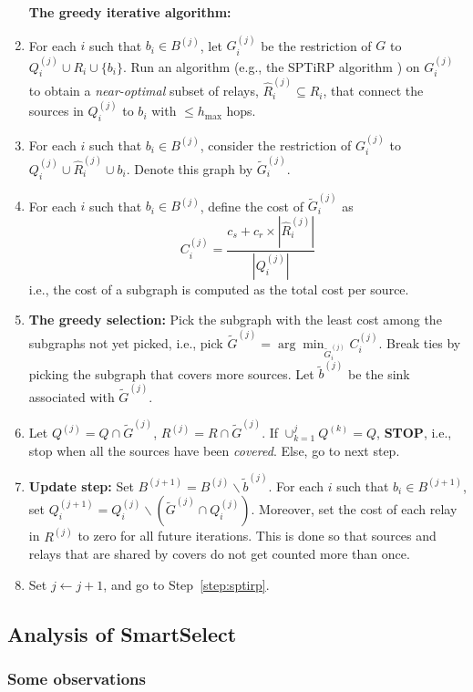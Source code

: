 \documentclass[conference]{IEEEtran}
\newcommand{\gap}{\vspace{2mm}}
\begin{document}
\begin{enumerate}
\gap
\noindent
\textbf{The greedy iterative algorithm:}
\item\label{step:sptirp} For each $i$ such that $b_i\in B^{(j)}$, let $G^{(j)}_i$ be the restriction of $G$ to $Q_i^{(j)}\cup R_i\cup\{b_i\}$. Run an algorithm (e.g., the SPTiRP algorithm \cite{fullpaper}) on $G^{(j)}_i$ to obtain a \emph{near-optimal} subset of relays, $\hat{R}^{(j)}_i\subseteq R_i$, that connect the sources in $Q^{(j)}_i$ to $b_i$ with $\leq h_{\max}$ hops. 
\item For each $i$ such that $b_i\in B^{(j)}$, consider the restriction of $G^{(j)}_i$ to $Q^{(j)}_i\cup \hat{R}^{(j)}_i\cup b_i$. Denote this graph by $\tilde{G}^{(j)}_i$.
\item For each $i$ such that $b_i\in B^{(j)}$, define the cost of $\tilde{G}^{(j)}_i$ as 
\begin{equation}
C_i^{(j)} = \frac{c_s+c_r\times |\hat{R}^{(j)}_i|}{|Q^{(j)}_i|}
\end{equation}
i.e., the cost of a subgraph is computed as the total cost per source.
\item \textbf{The greedy selection: }Pick the subgraph with the least cost among the subgraphs not yet picked, i.e., pick $\tilde{G}^{(j)}=\arg\min_{\tilde{G}^{(j)}_i}C^{(j)}_i$. Break ties by picking the subgraph that covers more sources. Let $\tilde{b}^{(j)}$ be the sink associated with $\tilde{G}^{(j)}$. 
\item Let $Q^{(j)}=Q\cap \tilde{G}^{(j)}$, $R^{(j)}=R\cap \tilde{G}^{(j)}$. If $\cup_{k=1}^{j}Q^{(k)}=Q$, \textbf{STOP}, i.e., stop when all the sources have been \emph{covered}. Else, go to next step.
\item \textbf{Update step: }Set $B^{(j+1)}=B^{(j)}\backslash \tilde{b}^{(j)}$. For each $i$ such that $b_i\in B^{(j+1)}$, set $Q_i^{(j+1)}=Q_i^{(j)}\backslash (\tilde{G}^{(j)}\cap Q_i^{(j)})$. Moreover, set the cost of each relay in $R^{(j)}$ to zero for all future iterations. This is done so that sources and relays that are shared by covers do not get counted more than once.
\item Set $j\leftarrow j+1$, and go to Step~\ref{step:sptirp}.  
\end{enumerate}


\subsection{Analysis of SmartSelect}
\subsubsection{Some observations}
\end{document}
